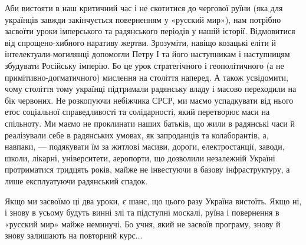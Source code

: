 Аби вистояти в наш критичний час і не скотитися до чергової руїни (яка для
українців завжди закінчується поверненням у «русский мир»), нам потрібно
засвоїти уроки імперського та радянського періодів у нашій історії. Відмовитися
від спрощено-хибного наративу жертви. Зрозуміти, навіщо козацькі еліти й
інтелектуали-могилянці допомогли Петру І та його наступникам і наступницям
збудувати Російську імперію. Бо це урок стратегічного і геополітичного (а не
примітивно-догматичного) мислення на століття наперед. А також усвідомити, чому
століття тому українці підтримали радянську владу і масово переходили на бік
червоних. Не розкопуючи небіжчика СРСР, ми маємо успадкувати від нього етос
соціальної справедливості та солідарності, який перетворює маси на спільноту.
Ми маємо не проклинати наших батьків, що жили в радянські часи й реалізували
себе в радянських умовах, як запроданців та колаборантів, а, навпаки, —
подякувати їм за житлові масиви, дороги, електростанції, заводи, школи,
лікарні, університети, аеропорти, що дозволили незалежній Україні протриматися
тридцять років, майже не інвестуючи в базову інфраструктуру, а лише
експлуатуючи радянський спадок.

Якщо ми засвоїмо ці два уроки, є шанс, що цього разу Україна вистоїть. Якщо ні,
і знову в усьому будуть винні злі та підступні москалі, руїна і повернення в
«русский мир» майже неминучі. Бо учня, який не засвоїв програму, знову й знову
залишають на повторний курс...
